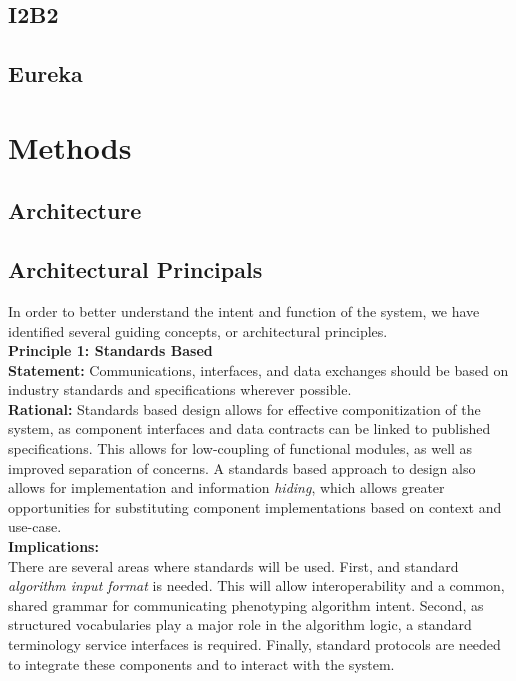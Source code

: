 \documentclass{amia}
\begin{document}
\subsection*{I2B2}
\subsection*{Eureka}

\section*{Methods}

\subsection*{Architecture}

\subsection*{Architectural Principals}
In order to better understand the intent and function of the system, we have identified several guiding concepts, or architectural principles\cite{garlan1993introduction}.\\

\textbf{Principle 1: Standards Based}\\
\textbf{Statement:} Communications, interfaces, and data exchanges should be based on industry standards and specifications wherever possible.\\
\textbf{Rational:} Standards based design allows for effective componitization of the system, as component interfaces and data contracts can be linked to published specifications. This allows for low-coupling of functional modules, as well as improved separation of concerns. A standards based approach to design also allows for implementation and information \textit{hiding}\cite{sullivan2001structure}, which allows greater opportunities for substituting component implementations based on context and use-case.\\
\textbf{Implications:}\\There are several areas where standards will be used. First, and standard \textit{algorithm input format} is needed. This will allow interoperability and a common, shared grammar for communicating phenotyping algorithm intent. Second, as structured vocabularies play a major role in the algorithm logic, a standard terminology service interfaces is required. Finally, standard protocols are needed to integrate these components and to interact with the system.
\end{document}
